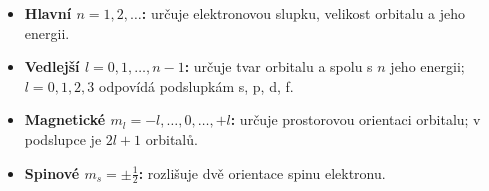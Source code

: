 \begin{itemize}
\item \textbf{Hlavní $n=1,2,\ldots$:} určuje elektronovou slupku, velikost orbitalu a jeho energii.
\item \textbf{Vedlejší $l=0,1,\ldots,n-1$:} určuje tvar orbitalu a spolu s $n$ jeho energii; $l=0,1,2,3$ odpovídá podslupkám s, p, d, f.
\item \textbf{Magnetické $m_l=-l,\ldots,0,\ldots,+l$:} určuje prostorovou orientaci orbitalu; v podslupce je $2l+1$ orbitalů.
\item \textbf{Spinové $m_s=\pm\tfrac12$:} rozlišuje dvě orientace spinu elektronu.
\end{itemize}
